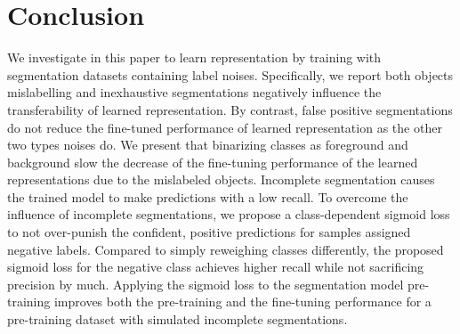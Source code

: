 \section{Conclusion}
\label{sec:conclusion}

We investigate in this paper to learn representation by training with segmentation datasets containing label noises.
Specifically, we report both objects mislabelling and inexhaustive segmentations negatively influence the transferability of learned representation.
By contrast, false positive segmentations do not reduce the fine-tuned performance of learned representation as the other two types noises do.
We present that binarizing classes as foreground and background slow the decrease of the fine-tuning performance of the learned representations due to the mislabeled objects.
Incomplete segmentation causes the trained model to make predictions with a low recall.
To overcome the influence of incomplete segmentations, we propose a class-dependent sigmoid loss to not over-punish the confident, positive predictions for samples assigned negative labels.
Compared to simply reweighing classes differently, the proposed sigmoid loss for the negative class achieves higher recall while not sacrificing precision by much.
Applying the sigmoid loss to the segmentation model pre-training improves both the pre-training and the fine-tuning performance for a pre-training dataset with simulated incomplete segmentations.
